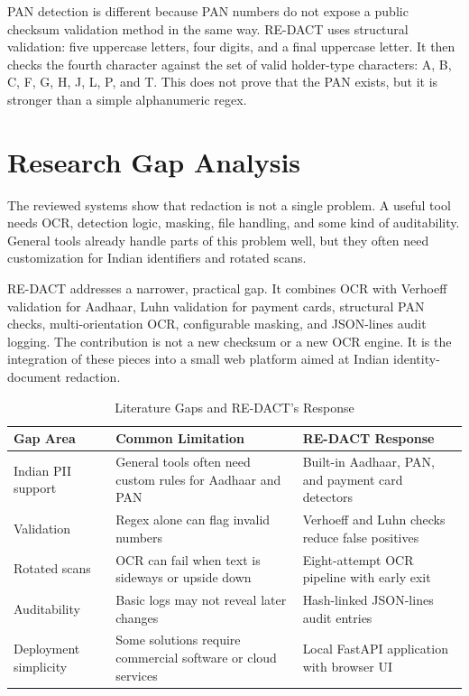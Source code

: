 PAN detection is different because PAN numbers do not expose a public checksum validation method in the same way. RE-DACT uses structural validation: five uppercase letters, four digits, and a final uppercase letter. It then checks the fourth character against the set of valid holder-type characters: A, B, C, F, G, H, J, L, P, and T. This does not prove that the PAN exists, but it is stronger than a simple alphanumeric regex.

\section{Research Gap Analysis}

The reviewed systems show that redaction is not a single problem. A useful tool needs OCR, detection logic, masking, file handling, and some kind of auditability. General tools already handle parts of this problem well, but they often need customization for Indian identifiers and rotated scans.

RE-DACT addresses a narrower, practical gap. It combines OCR with Verhoeff validation for Aadhaar, Luhn validation for payment cards, structural PAN checks, multi-orientation OCR, configurable masking, and JSON-lines audit logging. The contribution is not a new checksum or a new OCR engine. It is the integration of these pieces into a small web platform aimed at Indian identity-document redaction.

\begin{table}[htbp]
\caption{Literature Gaps and RE-DACT's Response}
\label{tab:lit_gaps}
\centering
\begin{tabular}{|p{3.5cm}|p{4.5cm}|p{4.5cm}|}
\hline
\textbf{Gap Area} & \textbf{Common Limitation} & \textbf{RE-DACT Response} \\
\hline
Indian PII support & General tools often need custom rules for Aadhaar and PAN & Built-in Aadhaar, PAN, and payment card detectors \\
\hline
Validation & Regex alone can flag invalid numbers & Verhoeff and Luhn checks reduce false positives \\
\hline
Rotated scans & OCR can fail when text is sideways or upside down & Eight-attempt OCR pipeline with early exit \\
\hline
Auditability & Basic logs may not reveal later changes & Hash-linked JSON-lines audit entries \\
\hline
Deployment simplicity & Some solutions require commercial software or cloud services & Local FastAPI application with browser UI \\
\hline
\end{tabular}
\end{table}

